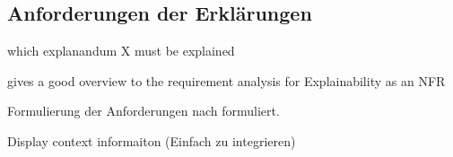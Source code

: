 \subsection{Anforderungen der Erklärungen}

which explanandum X must be explained \cite{kohl_explainability_2019}


\cite{golledge1999wayfinding}

\cite{bovy2012route}

\cite{kohl_explainability_2019} gives a good overview to the requirement analysis for Explainability as an NFR

Formulierung der Anforderungen nach \cite{rajnish2010quality, wiegers1999writing, alexander2002writing} formuliert.

Display context informaiton (Einfach zu integrieren) \cite{wiegand_id_2020}